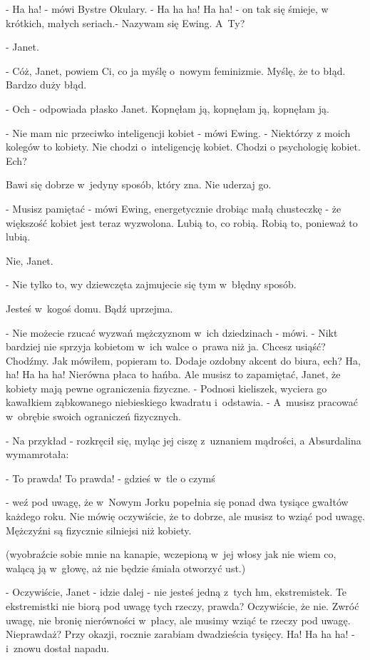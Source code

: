 \documentclass[oneside,polish,12pt,sfheadings]{mwbk}
\begin{document}
- Ha ha! - mówi Bystre Okulary. - Ha ha ha! Ha ha! - on tak się śmieje,
w krótkich, małych seriach.- Nazywam się Ewing. A~Ty?

- Janet.

- Cóż, Janet, powiem Ci, co ja myślę o~nowym feminizmie. Myślę, że
to błąd. Bardzo duży błąd.

- Och - odpowiada płasko Janet. Kopnęłam ją, kopnęłam ją, kopnęłam
ją.

- Nie mam nic przeciwko inteligencji kobiet - mówi Ewing. - Niektórzy
z moich kolegów to kobiety. Nie chodzi o~inteligencję kobiet. Chodzi
o psychologię kobiet. Ech?

Bawi się dobrze w~jedyny sposób, który zna. Nie uderzaj go.

- Musisz pamiętać - mówi Ewing, energetycznie drobiąc małą chusteczkę
- że większość kobiet jest teraz wyzwolona. Lubią to, co robią. Robią
to, ponieważ to lubią.

Nie, Janet.

- Nie tylko to, wy dziewczęta zajmujecie się tym w~błędny sposób.

Jesteś w~kogoś domu. Bądź uprzejma.

- Nie możecie rzucać wyzwań mężczyznom w~ich dziedzinach - mówi. -
Nikt bardziej nie sprzyja kobietom w~ich walce o~prawa niż ja. Chcesz
usiąść? Chodźmy. Jak mówiłem, popieram to. Dodaje ozdobny akcent do biura,
ech? Ha, ha! Ha ha ha! Nierówna płaca to hańba. Ale musisz to zapamiętać,
Janet, że kobiety mają pewne ograniczenia fizyczne. - Podnosi kieliszek, wyciera go kawałkiem ząbkowanego niebieskiego
kwadratu i~odstawia. - A~musisz pracować w~obrębie swoich ograniczeń
fizycznych.

- Na przykład - rozkręcił się, myląc jej ciszę z~uznaniem mądrości,
a Absurdalina wymamrotała: 

- To prawda! To prawda! - gdzieś w~tle
o czymś 

- weź pod uwagę, że w~Nowym Jorku popełnia się ponad dwa tysiące
gwałtów każdego roku. Nie mówię oczywiście, że to dobrze, ale musisz
to wziąć pod uwagę. Mężczyźni są fizycznie silniejsi niż kobiety.

(wyobraźcie sobie mnie na kanapie, wczepioną w~jej włosy jak nie wiem
co, walącą ją w~głowę, aż nie będzie śmiała otworzyć ust.)

- Oczywiście, Janet - idzie dalej - nie jesteś jedną z~tych hm, ekstremistek.
Te ekstremistki nie biorą pod uwagę tych rzeczy, prawda? Oczywiście,
że nie. Zwróć uwagę, nie bronię nierówności w~płacy, ale musimy wziąć
te rzeczy pod uwagę. Nieprawdaż? Przy okazji, rocznie zarabiam dwadzieścia
tysięcy. Ha! Ha ha ha! - i~znowu dostał napadu.
\end{document}
